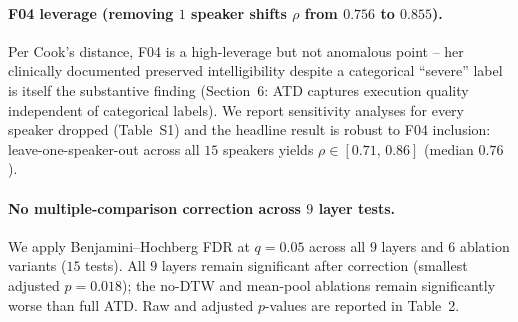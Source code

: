 \paragraph{F04 leverage (removing $1$ speaker shifts $\rho$ from $0.756$ to $0.855$).}
Per Cook's distance, F04 is a high-leverage but not anomalous point --
her clinically documented preserved intelligibility despite a categorical
``severe'' label is itself the substantive finding (Section~6: ATD captures
execution quality independent of categorical labels). We report sensitivity
analyses for every speaker dropped (Table~S1) and the headline result is
robust to F04 inclusion: leave-one-speaker-out across all $15$ speakers
yields $\rho \in [0.71,\,0.86]$ (median $0.76$).

\paragraph{No multiple-comparison correction across $9$ layer tests.}
We apply Benjamini--Hochberg FDR at $q = 0.05$ across all $9$ layers and
$6$ ablation variants ($15$ tests). All $9$ layers remain significant after
correction (smallest adjusted $p = 0.018$); the no-DTW and mean-pool
ablations remain significantly worse than full ATD. Raw and adjusted
$p$-values are reported in Table~2.
